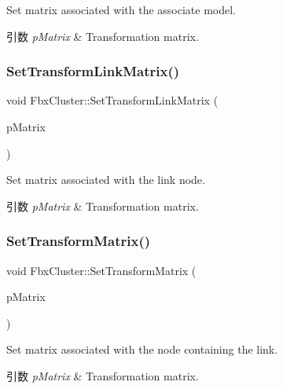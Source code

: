 Set matrix associated with the associate model. 
\begin{DoxyParams}{引数}
{\em p\+Matrix} & Transformation matrix. \\
\hline
\end{DoxyParams}
\mbox{\label{class_fbx_cluster_aa7d541a302bab3e32403968ba4ebc19c}} 
\subsubsection{\texorpdfstring{Set\+Transform\+Link\+Matrix()}{SetTransformLinkMatrix()}}
{\footnotesize\ttfamily void Fbx\+Cluster\+::\+Set\+Transform\+Link\+Matrix (\begin{DoxyParamCaption}\item[{const \hyperlink{class_fbx_a_matrix}{Fbx\+A\+Matrix} \&}]{p\+Matrix }\end{DoxyParamCaption})}

Set matrix associated with the link node. 
\begin{DoxyParams}{引数}
{\em p\+Matrix} & Transformation matrix. \\
\hline
\end{DoxyParams}
\mbox{\label{class_fbx_cluster_a93ec68575bffb98c18caac76341b0323}} 
\subsubsection{\texorpdfstring{Set\+Transform\+Matrix()}{SetTransformMatrix()}}
{\footnotesize\ttfamily void Fbx\+Cluster\+::\+Set\+Transform\+Matrix (\begin{DoxyParamCaption}\item[{const \hyperlink{class_fbx_a_matrix}{Fbx\+A\+Matrix} \&}]{p\+Matrix }\end{DoxyParamCaption})}

Set matrix associated with the node containing the link. 
\begin{DoxyParams}{引数}
{\em p\+Matrix} & Transformation matrix. \\
\hline
\end{DoxyParams}
\mbox{\label{class_fbx_cluster_a900f6774195ee098f945aa1d07a4a283}} 

